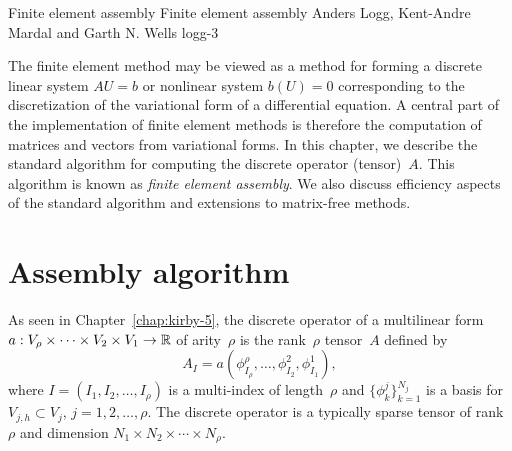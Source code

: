               {Finite element assembly}
              {Finite element assembly}
              {Anders Logg, Kent-Andre Mardal and Garth N. Wells}
              {logg-3}

The finite element method may be viewed as a method for forming a discrete
linear system $AU = b$ or nonlinear system $b(U) = 0$ corresponding to
the discretization of the variational form of a differential equation. A
central part of the implementation of finite element methods is therefore
the computation of matrices and vectors from variational forms. In this
chapter, we describe the standard algorithm for computing the discrete
operator (tensor)~$A$. This algorithm is known as \emph{finite element
assembly}. We also discuss efficiency aspects of the standard algorithm
and extensions to matrix-free methods.

\section{Assembly algorithm}

As seen in Chapter~\ref{chap:kirby-5}, the discrete operator of a
multilinear form~$a : V_{\rho} \times \cdots \times V_2 \times V_1
\rightarrow \mathbb{R}$ of arity~$\rho$ is the rank~$\rho$ tensor~$A$ defined
by
\begin{equation}
  A_I = a(\phi^{\rho}_{I_{\rho}}, \ldots, \phi^2_{I_2}, \phi^1_{I_1}),
\end{equation}
where $I = (I_1, I_2, \ldots, I_{\rho})$ is a multi-index of
length~$\rho$ and $\{\phi^j_k\}_{k=1}^{N_j}$ is a basis for $V_{j,h}
\subset V_j$, $j = 1,2,\ldots,\rho$. The discrete operator is a
typically sparse tensor of rank~$\rho$ and dimension $N_1 \times N_2
\times \cdots \times N_{\rho}$.

